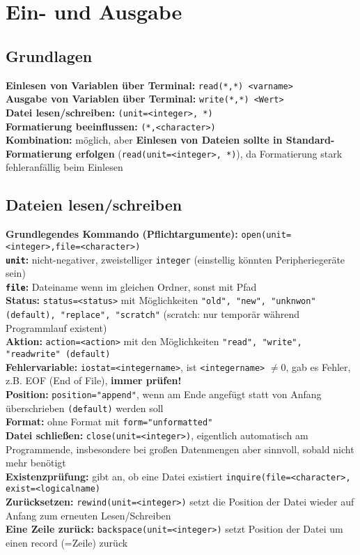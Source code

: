 \documentclass[a4paper, twocolumn]{scrarticle}
\begin{document}
 \section{Ein- und Ausgabe}
 \subsection{Grundlagen}
 \textbf{Einlesen von Variablen über Terminal:} \lstinline|read(*,*) <varname>|\\
 \textbf{Ausgabe von Variablen über Terminal:} \lstinline|write(*,*) <Wert>|\\
 \textbf{Datei lesen/schreiben:} \lstinline|(unit=<integer>, *)|\\
 \textbf{Formatierung beeinflussen:} \lstinline|(*,<character>)|\\
 \textbf{Kombination:} möglich, aber \textbf{Einlesen von Dateien sollte in Standard-Formatierung erfolgen} (\lstinline|read(unit=<integer>, *)|), da Formatierung stark fehleranfällig beim Einlesen
 
 \subsection{Dateien lesen/schreiben}
 \textbf{Grundlegendes Kommando (Pflichtargumente):} \lstinline|open(unit=<integer>,file=<character>)|\\
 \textbf{\lstinline|unit|:} nicht-negativer, zweistelliger \lstinline|integer| (einstellig könnten Peripheriegeräte sein)\\
 \textbf{\lstinline|file|:} Dateiname wenn im gleichen Ordner, sonst mit Pfad\\
 \textbf{Status:} \lstinline|status=<status>| mit Möglichkeiten \lstinline|"old", "new", "unknwon" (default), "replace", "scratch"| (scratch: nur temporär während Programmlauf existent)\\
 \textbf{Aktion:} \lstinline|action=<action>| mit den Möglichkeiten \lstinline|"read", "write", "readwrite" (default)|\\
 \textbf{Fehlervariable:} \lstinline|iostat=<integername>|, ist \lstinline|<integername>| $\neq 0$, gab es Fehler, z.B. EOF (End of File), \textbf{immer prüfen!}\\
 \textbf{Position:} \lstinline|position="append"|, wenn am Ende angefügt statt von Anfang überschrieben \lstinline|(default)| werden soll\\
 \textbf{Format:} ohne Format mit \lstinline|form="unformatted"|\\
 \textbf{Datei schließen:} \lstinline|close(unit=<integer>)|, eigentlich automatisch am Programmende, insbesondere bei großen Datenmengen aber sinnvoll, sobald nicht mehr benötigt\\
 \textbf{Existenzprüfung:} gibt an, ob eine Datei existiert \lstinline|inquire(file=<character>, exist=<logicalname)| \\
 \textbf{Zurücksetzen:} \lstinline|rewind(unit=<integer>)| setzt die Position der Datei wieder auf Anfang zum erneuten Lesen/Schreiben\\
 \textbf{Eine Zeile zurück:} \lstinline|backspace(unit=<integer>)| setzt Position der Datei um einen record (=Zeile) zurück
 
\end{document}
